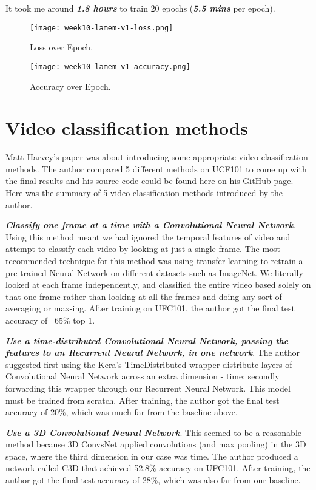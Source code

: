 It took me around \textbf{\emph{1.8 hours}} to train 20 epochs (\textbf{\emph{5.5 mins}} per epoch).

\begin{figure}[!ht]
\centering
\texttt{[image: week10-lamem-v1-loss.png]}
\caption{Loss over Epoch.}
\end{figure}

\begin{figure}[!ht]
\centering
\texttt{[image: week10-lamem-v1-accuracy.png]}
\caption{Accuracy over Epoch.}
\end{figure}

\section{Video classification methods}
Matt Harvey's paper\cite{5videomethods} was about introducing some appropriate video classification methods. The author compared 5 different methods on UCF101\cite{ucf101} to come up with the final results and his source code could be found \href{https://github.com/harvitronix/five-video-classification-methods}{here on his GitHub page}. Here was the summary of 5 video classification methods introduced by the author.

\textbf{\emph{Classify one frame at a time with a Convolutional Neural Network}}. Using this method meant we had ignored the temporal features of video and attempt to classify each video by looking at just a single frame. The most recommended technique for this method was using transfer learning to retrain a pre-trained Neural Network on different datasets such as ImageNet. We literally looked at each frame independently, and classified the entire video based solely on that one frame rather than looking at all the frames and doing any sort of averaging or max-ing. After training on UFC101, the author got the final test accuracy of ~65\% top 1.

\textbf{\emph{Use a time-distributed Convolutional Neural Network, passing the features to an Recurrent Neural Network, in one network}}. The author suggested first using the Kera's TimeDistributed wrapper distribute layers of Convolutional Neural Network across an extra dimension - time; secondly forwarding this wrapper through our Recurrent Neural Network. This model must be trained from scratch. After training, the author got the final test accuracy of 20\%, which was much far from the baseline above. 

\textbf{\emph{Use a 3D Convolutional Neural Network}}. This seemed to be a reasonable method because 3D ConvsNet applied convolutions (and max pooling) in the 3D space, where the third dimension in our case was time. The author produced a network called C3D that achieved 52.8\% accuracy on UFC101. After training, the author got the final test accuracy of 28\%, which was also far from our baseline.

